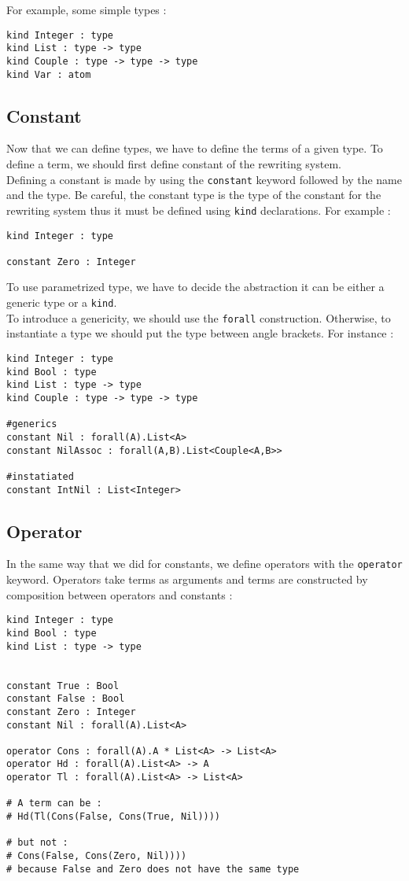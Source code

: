 \documentclass[12pt,a4paper]{article}
\begin{document}
For example, some simple types :
\begin{verbatim}
kind Integer : type
kind List : type -> type
kind Couple : type -> type -> type
kind Var : atom
\end{verbatim}


\subsection{Constant}
Now that we can define types, we have to define the terms of a given type.
To define a term, we should first define constant of the rewriting
system.\\
Defining a constant is made by using the \verb?constant? keyword followed
by the name and the type. Be careful, the constant
type is the type of the constant for the rewriting system thus it must
be defined using \verb?kind? declarations. For example :

\begin{verbatim}
kind Integer : type

constant Zero : Integer
\end{verbatim}

To use parametrized type, we have to decide the abstraction it can be
either a generic type or a \verb?kind?.\\
To introduce a genericity, we should use the \verb?forall?
construction. Otherwise, to instantiate a type we should put the type
between angle brackets. For instance :

\begin{verbatim}
kind Integer : type
kind Bool : type
kind List : type -> type
kind Couple : type -> type -> type

#generics
constant Nil : forall(A).List<A>
constant NilAssoc : forall(A,B).List<Couple<A,B>>

#instatiated
constant IntNil : List<Integer>
\end{verbatim}

\subsection{Operator}
In the same way that we did for constants, we define operators with the
\verb?operator? keyword. Operators take terms as arguments and terms
are constructed by composition between operators and constants :

\begin{verbatim}
kind Integer : type
kind Bool : type
kind List : type -> type


constant True : Bool
constant False : Bool
constant Zero : Integer
constant Nil : forall(A).List<A>

operator Cons : forall(A).A * List<A> -> List<A>
operator Hd : forall(A).List<A> -> A
operator Tl : forall(A).List<A> -> List<A>

# A term can be :
# Hd(Tl(Cons(False, Cons(True, Nil))))

# but not :
# Cons(False, Cons(Zero, Nil))))
# because False and Zero does not have the same type
\end{verbatim}
\end{document}
